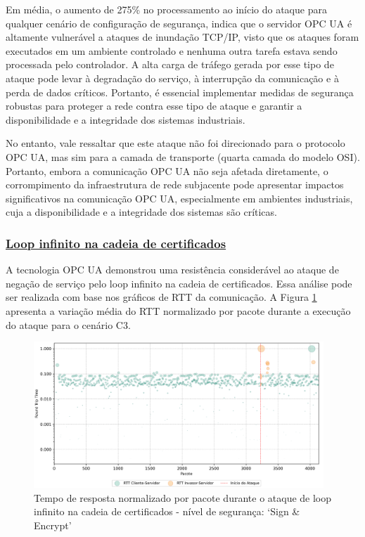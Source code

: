 Em média, o aumento de 275\% no processamento ao início do ataque para qualquer cenário de configuração de segurança, indica que o servidor OPC UA é altamente vulnerável a ataques de inundação TCP/IP, visto que os ataques foram executados em um ambiente controlado e nenhuma outra tarefa estava sendo processada pelo controlador. A alta carga de tráfego gerada por esse tipo de ataque pode levar à degradação do serviço, à interrupção da comunicação e à perda de dados críticos. Portanto, é essencial implementar medidas de segurança robustas para proteger a rede contra esse tipo de ataque e garantir a disponibilidade e a integridade dos sistemas industriais.

No entanto, vale ressaltar que este ataque não foi direcionado para o protocolo OPC UA, mas sim para a camada de transporte (quarta camada do modelo OSI). Portanto, embora a comunicação OPC UA não seja afetada diretamente, o corrompimento da infraestrutura de rede subjacente pode apresentar impactos significativos na comunicação OPC UA, especialmente em ambientes industriais, cuja a disponibilidade e a integridade dos sistemas são críticas.

\subsubsection*{\underline{Loop infinito na cadeia de certificados}}

A tecnologia OPC UA demonstrou uma resistência considerável ao ataque de negação de serviço pelo loop infinito na cadeia de certificados. Essa análise pode ser realizada com base nos gráficos de RTT da comunicação. A Figura \ref{fig:0-dos-cert-rttp} apresenta a variação média do RTT normalizado por pacote durante a execução do ataque para o cenário C3.

\begin{figure}[htbp!]
    \caption{\label{fig:0-dos-cert-rttp}Tempo de resposta normalizado por pacote durante o ataque de loop infinito na cadeia de certificados - nível de segurança: `Sign \& Encrypt'}
    \begin{center}
        \includegraphics[width=0.972\textwidth]{USPSC-img/output/cropped/2-dos_certificate_inf_chain_loop-rttp.png}
    \end{center}
\end{figure}

